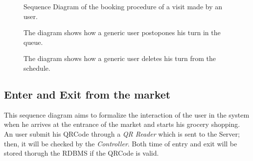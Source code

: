 \begin{figure}[H]
  \label{VisitSD}
  \centering
    \caption{Sequence Diagram of the booking procedure of a visit made by an user.}
\end{figure} 

\begin{figure}[H]
  \label{PostponeReservationSD}
  \centering
    \caption{The diagram shows how a generic user postopones his turn in the queue. }
\end{figure} 


\begin{figure}[H]
  \label{DeleteVisitSD}
  \centering
    \caption{The diagram shows how a generic user deletes his turn from the schedule.}
\end{figure} 


\subsection{Enter and Exit from the market}
This sequence diagram aims to formalize the interaction of the user in the system when he arrives at the entrance of the market and starts his grocery shopping.
An user submit his QRCode through a \textit{QR Reader} which is sent to the Server; then, it will be checked by the \textit{Controller}. Both time of entry and exit will be stored thorugh the RDBMS if the QRCode is valid.

